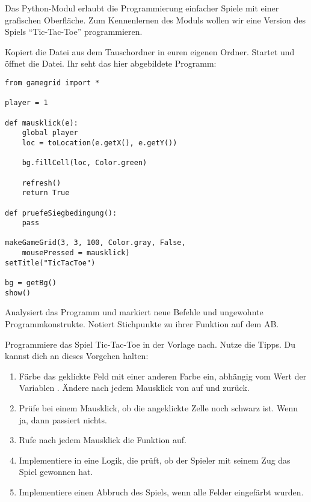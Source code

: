 \documentclass[11pt, a4paper, ngerman]{arbeitsblatt}
\begin{document}
\ReiheTitel

Das Python-Modul  erlaubt die Programmierung einfacher Spiele mit einer grafischen Oberfläche. Zum Kennenlernen des Moduls wollen wir eine Version des Spiels \enquote{Tic-Tac-Toe} programmieren.

\begin{aufgabe}[icon=\iconPartner\,\iconComputer]
Kopiert die Datei  aus dem Tauschordner in euren eigenen Ordner. Startet  und öffnet die Datei. Ihr seht das hier abgebildete Programm:
\begin{verbatim}
from gamegrid import *

player = 1

def mausklick(e):
    global player
    loc = toLocation(e.getX(), e.getY())

    bg.fillCell(loc, Color.green)

    refresh()
    return True

def pruefeSiegbedingung():
	pass

makeGameGrid(3, 3, 100, Color.gray, False,
    mousePressed = mausklick)
setTitle("TicTacToe")

bg = getBg()
show()
\end{verbatim}

Analysiert das Programm und markiert neue Befehle und ungewohnte Programmkonstrukte. Notiert Stichpunkte zu ihrer Funktion auf dem AB.
\end{aufgabe}

\begin{aufgabe}[icon=\iconPartner\,\iconComputer]
Programmiere das Spiel Tic-Tac-Toe in der Vorlage nach. Nutze die Tipps. Du kannst dich an dieses Vorgehen halten:
\begin{enumerate}
	\item Färbe das geklickte Feld mit einer anderen Farbe ein, abhängig vom Wert der Variablen . Ändere  nach jedem Mausklick von  auf  und zurück.
	\item Prüfe bei einem Mausklick, ob die angeklickte Zelle noch schwarz ist. Wenn ja, dann passiert nichts.
	\item Rufe nach jedem Mausklick die Funktion  auf.
	\item Implementiere in  eine Logik, die prüft, ob der Spieler mit seinem Zug das Spiel gewonnen hat.
	\item Implementiere einen Abbruch des Spiels, wenn alle Felder eingefärbt wurden.
\end{enumerate}
\end{aufgabe}
\end{document}
